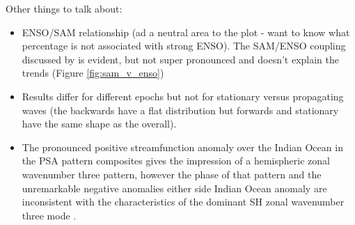 Other things to talk about:
\begin{itemize}
\item ENSO/SAM relationship (ad a neutral area to the plot - want to know what percentage is not associated with strong ENSO). The SAM/ENSO coupling discussed by \citet{Fogt2006} is evident, but not super pronounced and doesn't explain the trends (Figure \ref{fig:sam_v_enso})
\item Results differ for different epochs but not for stationary versus propagating waves (the backwards have a flat distribution but forwards and stationary have the same shape as the overall).
\item The pronounced positive streamfunction anomaly over the Indian Ocean in the PSA pattern composites gives the impression of a hemispheric zonal wavenumber three pattern, however the phase of that pattern and the unremarkable negative anomalies either side Indian Ocean anomaly are inconsistent with the characteristics of the dominant SH zonal wavenumber three mode \citep[e.g.][]{Raphael2004,IrvingSimmonds2015}.
\end{itemize}


